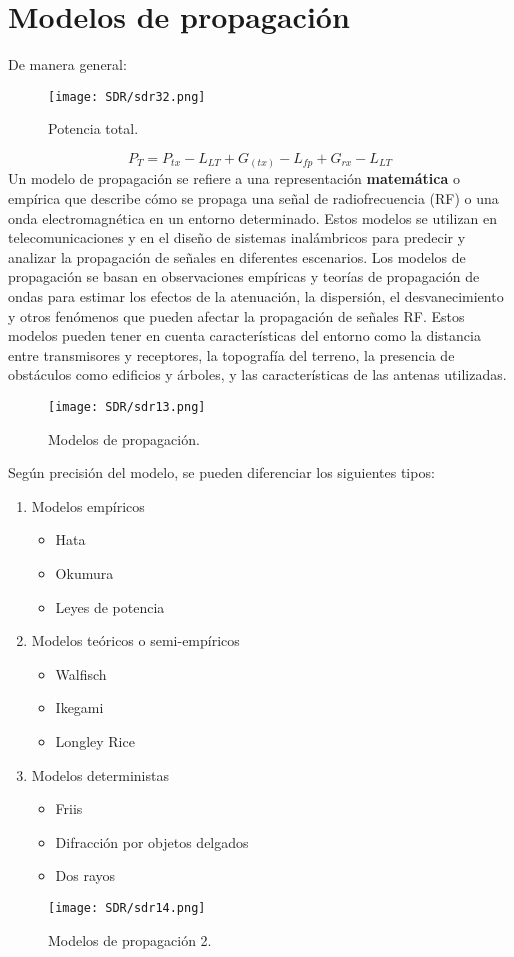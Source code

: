\documentclass[
	12pt, %
	fleqn, %
	a4paper, %
	oneside, %
]{LegrandOrangeBook}
\begin{document}
\section{Modelos de propagación}
De manera general:
\begin{figure}[H]
\centering
\texttt{[image: SDR/sdr32.png]}
\caption{Potencia total.}
\end{figure}
\begin{equation}
P_T=P_{tx}-L_{LT}+G_(tx)-L_{fp}+G_{rx}-L_{LT}
\end{equation}
Un modelo de propagación se refiere a una representación \textbf{matemática} o empírica que describe cómo se propaga una señal de radiofrecuencia (RF) o una onda electromagnética en un entorno determinado. Estos modelos se utilizan en telecomunicaciones y en el diseño de sistemas inalámbricos para predecir y analizar la propagación de señales en diferentes escenarios. Los modelos de propagación se basan en observaciones empíricas y teorías de propagación de ondas para estimar los efectos de la atenuación, la dispersión, el desvanecimiento y otros fenómenos que pueden afectar la propagación de señales RF. Estos modelos pueden tener en cuenta características del entorno como la distancia entre transmisores y receptores, la topografía del terreno, la presencia de obstáculos como edificios y árboles, y las características de las antenas utilizadas.
\begin{figure}[H]
\centering
\texttt{[image: SDR/sdr13.png]}
\caption{Modelos de propagación.}
\end{figure}
Según precisión del modelo, se pueden diferenciar los siguientes tipos:
\begin{enumerate}
\item Modelos empíricos
\begin{itemize}
\item Hata
\item Okumura
\item Leyes de potencia
\end{itemize}
\item Modelos teóricos o semi-empíricos
\begin{itemize}
\item Walfisch
\item Ikegami
\item Longley Rice
\end{itemize}
\item Modelos deterministas
\begin{itemize}
\item Friis
\item Difracción por objetos delgados
\item Dos rayos
\end{itemize}
\end{enumerate}
\begin{figure}[H]
\centering
\texttt{[image: SDR/sdr14.png]}
\caption{Modelos de propagación 2.}
\end{figure}
\end{document}
